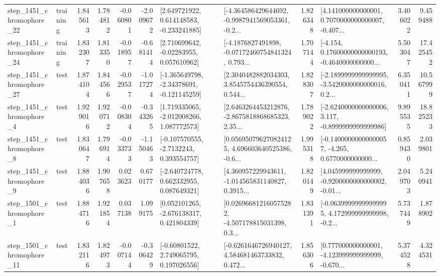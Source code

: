 \begin{tabular}{llrrrrllrlrr}
 step\_1451\_chromophore\_22 &  training &      1.845613 &    1.784812 &     -0.060801 & -2.009672 &    [2.649721922, 0.614148583, -0.233241885] &  [-4.364586429644692, -0.9987941569053361, -0.2... &       1.826348 &  [4.141000000000001, 0.7070000000000007, -0.407... &            3.406022 &          9.459488 \\
 step\_1451\_chromophore\_24 &  training &      1.832307 &    1.813350 &     -0.018957 & -0.681414 &     [2.710699642, -0.02283955, 0.057610962] &  [-4.1876827491898, -0.07172460754841324, 0.793... &       1.707144 &  [-4.154, 0.17600000000000193, -0.4640000000000... &            5.503047 &         17.425452 \\
 step\_1451\_chromophore\_27 &      test &      1.874104 &    1.844566 &     -0.029537 & -1.017274 &   [-1.365649798, -2.34378691, -0.121145259] &  [2.3040482882034303, 3.8545754436390554, 0.544... &       1.828307 &  [-2.1899999999999995, -3.5420000000000016, 0.2... &            6.350411 &         10.567999 \\
  step\_1451\_chromophore\_4 &      test &      1.929016 &    1.920712 &     -0.008304 & -0.343265 &    [1.719335065, -2.012008266, 1.087772573] &  [2.6463264453212876, -2.8675818868685323, 2.35... &       1.789022 &  [-2.6240000000000006, 3.117, -0.8999999999999986] &            9.895535 &         18.825233 \\
  step\_1451\_chromophore\_8 &      test &      1.830647 &    1.796914 &     -0.033733 & -1.150463 &     [-0.107570555, -2.7132243, 0.393554757] &  [0.056950796270824125, 4.696603640525386, -0.6... &       1.995318 &  [-0.14000000000000057, -4.265, 0.6770000000000... &            0.859430 &          2.039801 \\
  step\_1451\_chromophore\_9 &      test &      1.884036 &    1.907658 &      0.023623 &  0.670177 &    [-2.640724778, 0.662332955, 0.087649321] &  [4.360957229943611, -1.014565831140827, 0.3915... &       1.820149 &  [4.045999999999999, -0.9200000000000002, -0.01... &            2.049703 &          5.240941 \\
  step\_1501\_chromophore\_1 &      test &      1.884716 &    1.921854 &      0.037138 &  1.099175 &    [0.052101265, -2.676138317, 0.421804339] &  [0.026966812160575282, -4.507178815031398, 0.3... &       1.831391 &  [-0.06399999999999995, 4.172999999999998, -0.2... &            5.737449 &          1.878902 \\
 step\_1501\_chromophore\_11 &      test &      1.832116 &    1.824973 &     -0.007144 & -0.306429 &     [-0.60801522, 2.749065795, 0.197026556] &  [-0.6261646726940127, 4.584681463733832, 0.472... &       1.856306 &  [0.777000000000001, -4.123999999999999, -0.670... &            5.374528 &          4.324531 \\

\end{tabular}
